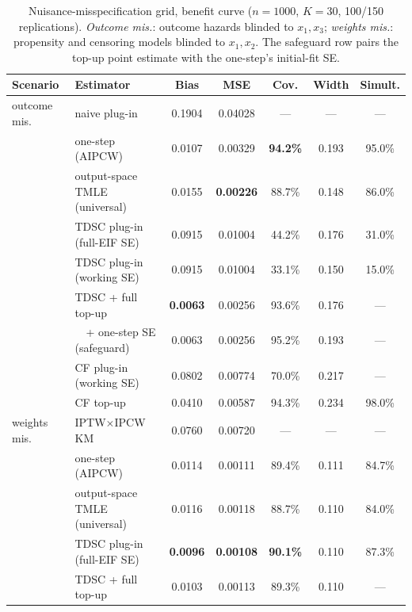 \documentclass[11pt]{article}
\theoremstyle{remark}
\begin{document}
\begin{table}[t]
\centering\small
\caption{Nuisance-misspecification grid, benefit curve ($n=1000$, $K=30$, 100/150 replications). \emph{Outcome mis.}: outcome hazards blinded to $x_1, x_3$; \emph{weights mis.}: propensity and censoring models blinded to $x_1, x_2$. The safeguard row pairs the top-up point estimate with the one-step's initial-fit SE.}
\label{tab:mis}
\begin{tabular}{llccccc}
\toprule
Scenario & Estimator & Bias & MSE & Cov. & Width & Simult. \\
\midrule
outcome mis. & naive plug-in            & 0.1904 & 0.04028 & --- & --- & --- \\
             & one-step (AIPCW)         & 0.0107 & 0.00329 & \textbf{94.2\%} & 0.193 & 95.0\% \\
             & output-space TMLE (universal) & 0.0155 & \textbf{0.00226} & 88.7\% & 0.148 & 86.0\% \\
             & TDSC plug-in (full-EIF SE) & 0.0915 & 0.01004 & 44.2\% & 0.176 & 31.0\% \\
             & TDSC plug-in (working SE)  & 0.0915 & 0.01004 & 33.1\% & 0.150 & 15.0\% \\
             & TDSC + full top-up       & \textbf{0.0063} & 0.00256 & 93.6\% & 0.176 & --- \\
             & \ \ + one-step SE (safeguard) & 0.0063 & 0.00256 & 95.2\% & 0.193 & --- \\
             & CF plug-in (working SE)  & 0.0802 & 0.00774 & 70.0\% & 0.217 & --- \\
             & CF top-up                & 0.0410 & 0.00587 & 94.3\% & 0.234 & 98.0\% \\
\midrule
weights mis. & IPTW$\times$IPCW KM      & 0.0760 & 0.00720 & --- & --- & --- \\
             & one-step (AIPCW)         & 0.0114 & 0.00111 & 89.4\% & 0.111 & 84.7\% \\
             & output-space TMLE (universal) & 0.0116 & 0.00118 & 88.7\% & 0.110 & 84.0\% \\
             & TDSC plug-in (full-EIF SE) & \textbf{0.0096} & \textbf{0.00108} & \textbf{90.1\%} & 0.110 & 87.3\% \\
             & TDSC + full top-up       & 0.0103 & 0.00113 & 89.3\% & 0.110 & --- \\
\bottomrule
\end{tabular}
\end{table}
\end{document}
